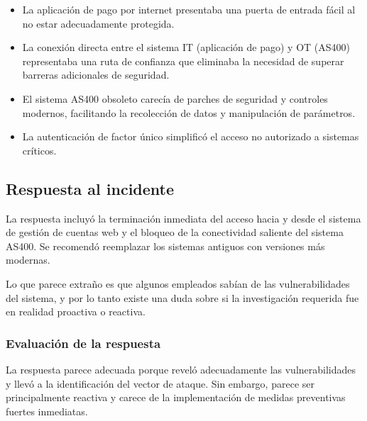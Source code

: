 \begin{itemize}
    \item La aplicación de pago por internet presentaba una puerta de entrada fácil al no estar adecuadamente protegida.
    
    \item La conexión directa entre el sistema IT (aplicación de pago) y OT (AS400) representaba una ruta de confianza que eliminaba la necesidad de superar barreras adicionales de seguridad.
    
    \item El sistema AS400 obsoleto carecía de parches de seguridad y controles modernos, facilitando la recolección de datos y manipulación de parámetros.
    
    \item La autenticación de factor único simplificó el acceso no autorizado a sistemas críticos.
\end{itemize}

\subsection{Respuesta al incidente}

La respuesta incluyó la terminación inmediata del acceso hacia y desde el sistema de gestión de cuentas web y el bloqueo de la conectividad saliente del sistema AS400. Se recomendó reemplazar los sistemas antiguos con versiones más modernas.

Lo que parece extraño es que algunos empleados sabían de las vulnerabilidades del sistema, y por lo tanto existe una duda sobre si la investigación requerida fue en realidad proactiva o reactiva.

\subsubsection{Evaluación de la respuesta}
La respuesta parece adecuada porque reveló adecuadamente las vulnerabilidades y llevó a la identificación del vector de ataque. Sin embargo, parece ser principalmente reactiva y carece de la implementación de medidas preventivas fuertes inmediatas.

